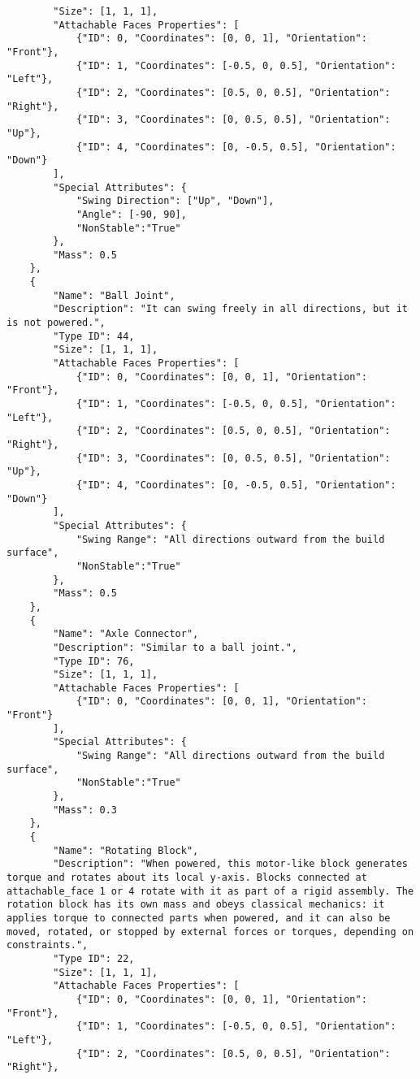 \begin{lstlisting}
        "Size": [1, 1, 1],
        "Attachable Faces Properties": [
            {"ID": 0, "Coordinates": [0, 0, 1], "Orientation": "Front"},
            {"ID": 1, "Coordinates": [-0.5, 0, 0.5], "Orientation": "Left"},
            {"ID": 2, "Coordinates": [0.5, 0, 0.5], "Orientation": "Right"},
            {"ID": 3, "Coordinates": [0, 0.5, 0.5], "Orientation": "Up"},
            {"ID": 4, "Coordinates": [0, -0.5, 0.5], "Orientation": "Down"}
        ],
        "Special Attributes": {
            "Swing Direction": ["Up", "Down"],
            "Angle": [-90, 90],
            "NonStable":"True"
        },
        "Mass": 0.5
    },
    {
        "Name": "Ball Joint",
        "Description": "It can swing freely in all directions, but it is not powered.",
        "Type ID": 44,
        "Size": [1, 1, 1],
        "Attachable Faces Properties": [
            {"ID": 0, "Coordinates": [0, 0, 1], "Orientation": "Front"},
            {"ID": 1, "Coordinates": [-0.5, 0, 0.5], "Orientation": "Left"},
            {"ID": 2, "Coordinates": [0.5, 0, 0.5], "Orientation": "Right"},
            {"ID": 3, "Coordinates": [0, 0.5, 0.5], "Orientation": "Up"},
            {"ID": 4, "Coordinates": [0, -0.5, 0.5], "Orientation": "Down"}
        ],
        "Special Attributes": {
            "Swing Range": "All directions outward from the build surface",
            "NonStable":"True"
        },
        "Mass": 0.5
    },
    {
        "Name": "Axle Connector",
        "Description": "Similar to a ball joint.",
        "Type ID": 76,
        "Size": [1, 1, 1],
        "Attachable Faces Properties": [
            {"ID": 0, "Coordinates": [0, 0, 1], "Orientation": "Front"}
        ],
        "Special Attributes": {
            "Swing Range": "All directions outward from the build surface",
            "NonStable":"True"
        },
        "Mass": 0.3
    },
    {
        "Name": "Rotating Block",
        "Description": "When powered, this motor-like block generates torque and rotates about its local y-axis. Blocks connected at attachable_face 1 or 4 rotate with it as part of a rigid assembly. The rotation block has its own mass and obeys classical mechanics: it applies torque to connected parts when powered, and it can also be moved, rotated, or stopped by external forces or torques, depending on constraints.",
        "Type ID": 22,
        "Size": [1, 1, 1],
        "Attachable Faces Properties": [
            {"ID": 0, "Coordinates": [0, 0, 1], "Orientation": "Front"},
            {"ID": 1, "Coordinates": [-0.5, 0, 0.5], "Orientation": "Left"},
            {"ID": 2, "Coordinates": [0.5, 0, 0.5], "Orientation": "Right"},

\end{lstlisting}
